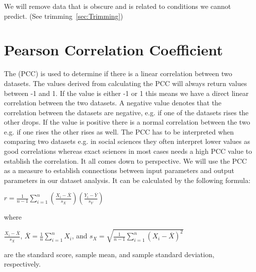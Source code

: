 We will remove data that is obscure and is related to conditions we cannot predict. (See trimming~\ref{sec:Trimming})

\section{Pearson Correlation Coefficient}
\label{sec:Pearsons}
The (PCC) is used to determine if there is a linear correlation between two datasets. The values derived from calculating the PCC will always return values between -1 and 1. If the value is either -1 or 1 this means we have a direct linear correlation between the two datasets. A negative value denotes that the correlation between the datasets are negative, e.g. if one of the datasets rises the other drops. If the value is positive there is a normal correlation between the two e.g. if one rises the other rises as well. The PCC has to be interpreted when comparing two datasets e.g. in social sciences they often interpret lower values as good correlations whereas exact sciences in most cases needs a high PCC value to establish the correlation. It all comes down to perspective. We will use the PCC as a measure to establish connections between input parameters and output parameters in our dataset analysis. It can be calculated by the following formula:

\begin{center}
$ r = \frac{1}{n-1}\sum_{i=1}^{n}(\frac{X_i-\overline{X}}{s_X})(\frac{Y_i-\overline{Y}}{s_Y})$
\end{center}

\noindent where 

\begin{center}
$ \frac{X_i-\overline{X}}{s_X}$,   $\overline{X} = \frac{1}{n}\sum_{i=1}^{n}X_i$,   and $s_X = \sqrt{\frac{1}{n-1}\sum_{i=1}^{n}(X_i-\overline{X})^2}$
\end{center}

\noindent are the standard score, sample mean, and sample standard deviation, respectively.
